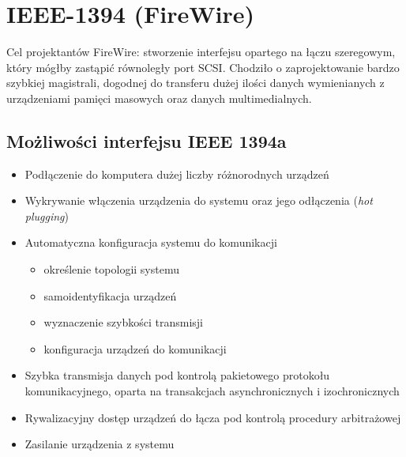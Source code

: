 \section{IEEE-1394 (FireWire)}
Cel projektantów FireWire: stworzenie interfejsu opartego na łączu szeregowym, który mógłby zastąpić równoległy port SCSI. Chodziło o zaprojektowanie bardzo szybkiej magistrali, dogodnej do transferu dużej ilości danych wymienianych z urządzeniami pamięci masowych oraz danych multimedialnych.

\subsection{Możliwości interfejsu IEEE 1394a}
\begin{itemize}
	\item Podłączenie do komputera dużej liczby różnorodnych urządzeń
	\item Wykrywanie włączenia urządzenia do systemu oraz jego odłączenia (\emph{hot plugging})
	\item Automatyczna konfiguracja systemu do komunikacji
	\begin{itemize}
		\item określenie topologii systemu
		\item samoidentyfikacja urządzeń
		\item wyznaczenie szybkości transmisji
		\item konfiguracja urządzeń do komunikacji
	\end{itemize}
	\item Szybka transmisja danych pod kontrolą pakietowego protokołu komunikacyjnego, oparta na transakcjach asynchronicznych i izochronicznych
	\item Rywalizacyjny dostęp urządzeń do łącza pod kontrolą procedury arbitrażowej
	\item Zasilanie urządzenia z systemu
\end{itemize}

